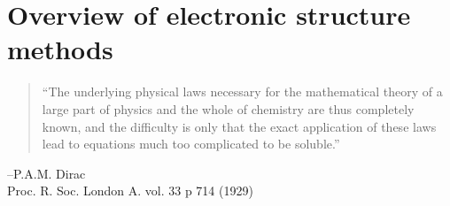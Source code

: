 \documentclass[11pt,oneside,final]{huthesis}%
\begin{document}
















\chapter{Overview of electronic structure methods}\label{chp:elec-struct}
\begin{quote}
``The underlying physical laws necessary for the mathematical theory of a large part of physics and the whole of chemistry are thus completely known, and the difficulty is only that the exact application of these laws lead to equations much too complicated to be soluble.''
\end{quote}
--P.A.M. Dirac\\
\phantom{--}Proc. R. Soc. London A. vol. 33 p 714 (1929)
\end{document}
